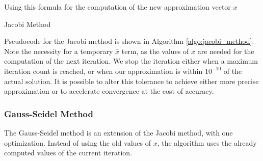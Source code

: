 \documentclass[../fem.tex]{subfile}
\begin{document}
%      

Using this formula for the computation of the new approximation vector $x$

\begin{algorithm}[H]
  \caption{Jacobi Method}\label{algo:jacobi_method}
  \begin{algorithmic}
    \EndFor
    \EndFor
    \EndIf
    \EndFor
  \end{algorithmic}
\end{algorithm}

Pseudocode for the Jacobi method is shown in Algorithm \ref{algo:jacobi_method}.
Note the necessity for a temporary $\bar{x}$ term, as the values of $x$ are
needed for the computation of the next iteration. We stop the iteration either
when a maximum iteration count is reached, or when our approximation is within
$10^{-10}$ of the actual solution. It is possible to alter this tolerance to
achieve either more precise approximation or to accelerate convergence at the
cost of accuracy.


\subsubsection{Gauss-Seidel Method}%
\label{ssub:gauss_seidel_method}

The Gauss-Seidel method is an extension of the Jacobi method, with one
optimization. Instead of using the old values of $x$, the algorithm uses the
already computed values of the current iteration.

%      
\end{document}
